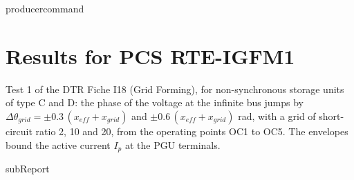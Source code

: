 {{ producercommand }}



    \section{Results for PCS RTE-IGFM1}

    Test 1 of the DTR Fiche I18 (Grid Forming), for non-synchronous storage units of type C
    and D: the phase of the voltage at the infinite bus jumps by
    \(\Delta\theta_{grid} = \pm 0.3\,(x_{eff} + x_{grid})\) and \(\pm 0.6\,(x_{eff} + x_{grid})\)
    rad, with a grid of short-circuit ratio 2, 10 and 20, from the operating points OC1 to OC5.
    The envelopes bound the active current \(I_p\) at the PGU terminals.

    {{subReport}}
    \newpage
